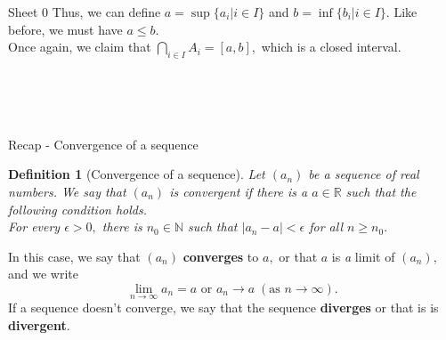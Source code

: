 \documentclass[handout, aspectratio=169]{beamer}
\newtheorem{defn}{Definition}
\begin{document}
\begin{frame}{Sheet 0}
    Thus, we can define $a = \sup\{a_i | i \in I\}$ and $b = \inf\{b_i | i \in I\}.$
    Like before, we must have $a \le b.$\\
    Once again, we claim that $\displaystyle\bigcap_{i\in I}A_i = [a, b],$ which is a closed interval.

    \begin{enumerate}
        \setcounter{enumi}{10}
        \\
        \\
        \\
    \end{enumerate}
\end{frame}
\begin{frame}{Recap - Convergence of a sequence}
    \begin{defn}[Convergence of a sequence]
        Let $(a_n)$ be a sequence of real numbers. We say that $(a_n)$ is convergent if there is a $a \in \mathbb{R}$ such that the following condition holds.\\
        For every $\epsilon > 0,$ there is $n_0 \in \mathbb{N}$ such that $|a_n - a| < \epsilon$ for all $n \ge n_0.$
    \end{defn}
    In this case, we say that $(a_n)$ \textbf{converges} to $a,$ or that $a$ is \emph{a} limit of $(a_n),$ and we write 
    \[\lim_{n\to \infty} a_n = a \text{ or } a_n \longrightarrow a \;(\text{as }n \longrightarrow \infty).\]
    If a sequence doesn't converge, we say that the sequence \textbf{diverges} or that is is \textbf{divergent}.
\end{frame}
\end{document}
